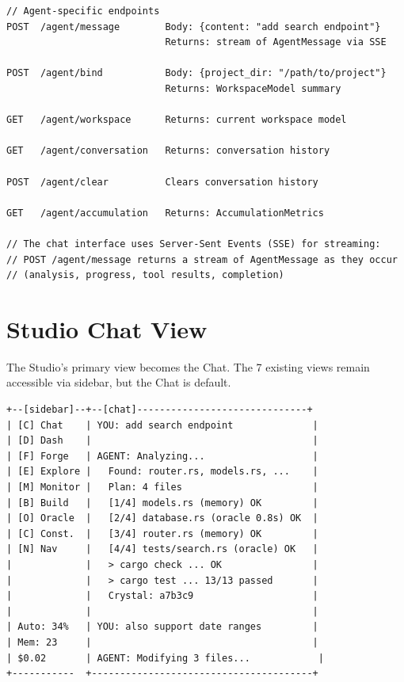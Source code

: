 \documentclass[11pt,a4paper,twoside]{article}
\theoremstyle{definition}
\theoremstyle{remark}
\begin{document}
\begin{lstlisting}
// Agent-specific endpoints
POST  /agent/message        Body: {content: "add search endpoint"}
                            Returns: stream of AgentMessage via SSE

POST  /agent/bind           Body: {project_dir: "/path/to/project"}
                            Returns: WorkspaceModel summary

GET   /agent/workspace      Returns: current workspace model

GET   /agent/conversation   Returns: conversation history

POST  /agent/clear          Clears conversation history

GET   /agent/accumulation   Returns: AccumulationMetrics

// The chat interface uses Server-Sent Events (SSE) for streaming:
// POST /agent/message returns a stream of AgentMessage as they occur
// (analysis, progress, tool results, completion)
\end{lstlisting}


\section{Studio Chat View}\label{sec:chatview}

The Studio's primary view becomes the Chat. The 7 existing views
remain accessible via sidebar, but the Chat is default.

\begin{lstlisting}[title={Studio Layout with Chat}]
+--[sidebar]--+--[chat]------------------------------+
| [C] Chat    | YOU: add search endpoint              |
| [D] Dash    |                                       |
| [F] Forge   | AGENT: Analyzing...                   |
| [E] Explore |   Found: router.rs, models.rs, ...    |
| [M] Monitor |   Plan: 4 files                       |
| [B] Build   |   [1/4] models.rs (memory) OK         |
| [O] Oracle  |   [2/4] database.rs (oracle 0.8s) OK  |
| [C] Const.  |   [3/4] router.rs (memory) OK         |
| [N] Nav     |   [4/4] tests/search.rs (oracle) OK   |
|             |   > cargo check ... OK                |
|             |   > cargo test ... 13/13 passed       |
|             |   Crystal: a7b3c9                     |
|             |                                       |
| Auto: 34%   | YOU: also support date ranges         |
| Mem: 23     |                                       |
| $0.02       | AGENT: Modifying 3 files...            |
+-----------  +---------------------------------------+
\end{lstlisting}
\end{document}
